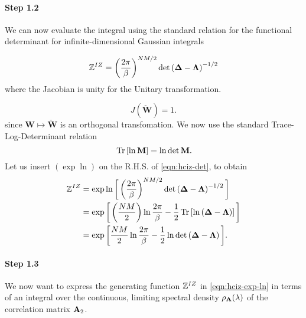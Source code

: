 \paragraph{Step 1.2}

We can now evaluate the
integral using the standard relation for the functional determinant for infinite-dimensional Gaussian integrals~\cite{EngelAndVanDenBroeck}

\begin{equation}
\label{eqn:hciz-det}
    \mathbb{Z}^{IZ}=\left(\dfrac{2\pi}{\beta}\right)^{NM/2}\det\left(\mathbf{\Delta}-\mathbf{\Lambda}\right)^{-1/2}
\end{equation}
where the Jacobian is unity for the Unitary transformation.

\begin{equation}\label{eqn:Jacobian}
    J(\mathbf{\check{W}})=1  .
\end{equation}
since $\mathbf{W} \mapsto \check{\mathbf{W}}$  is an orthogonal transfomation.
We now use the standard Trace-Log-Determinant relation~\cite{EngelAndVanDenBroeck}
\begin{equation}\label{eqn:tr-ln-det}
    \mbox{}\operatorname{Tr}\left[\ln\mathbf{M}\right]=\ln\det\mathbf{M}  .
\end{equation}
Let us insert $(\exp\ln)$ on the R.H.S. of \ref{eqn:hciz-det}, to obtain
\begin{align}
\nonumber
\mathbb{Z}^{IZ}
  &=\exp\ln\bigg[\left(\dfrac{2\pi}{\beta}\right)^{NM/2}\det\left(\mathbf{\Delta}-\mathbf{\Lambda}\right)^{-1/2}\bigg] \\ 
\nonumber
  & =\exp\bigg[\left(\dfrac{NM}{2}\right)\ln\dfrac{2\pi}{\beta}-\dfrac{1}{2}\mbox{}\operatorname{Tr}\left[\ln\left(\mathbf{\Delta}-\mathbf{\Lambda}
\right)\right]\bigg] \\ 
\label{eqn:hciz-exp-ln}
  & =\exp\bigg[\dfrac{NM}{2}\ln\dfrac{2\pi}{\beta}-\dfrac{1}{2}\ln\det\left(\mathbf{\Delta}-\mathbf{\Lambda}\right)\bigg]  .
\end{align}


\paragraph{Step 1.3}
We now want to express
the generating function $\mathbb{Z}^{IZ}$ 
in \ref{eqn:hciz-exp-ln}
in terms of an integral over the continuous, limiting spectral density
$\rho_{\mathbf{A}}(\lambda)$ of the correlation matrix $\mathbf{A}_{2}$.  

